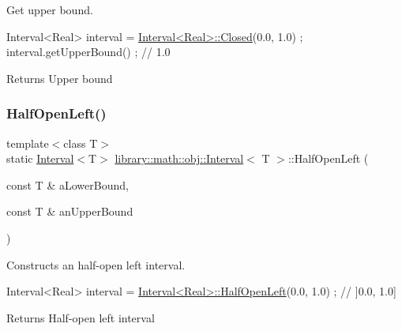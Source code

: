Get upper bound. 


\begin{DoxyCode}
Interval<Real> interval = \hyperlink{classlibrary_1_1math_1_1obj_1_1_interval_aae8bb2b89af450729338d48563def4d7}{Interval<Real>::Closed}(0.0, 1.0) ;
interval.getUpperBound() ; \textcolor{comment}{// 1.0}
\end{DoxyCode}


\begin{DoxyReturn}{Returns}
Upper bound 
\end{DoxyReturn}
\mbox{\label{classlibrary_1_1math_1_1obj_1_1_interval_a7e706c1e5133c731645e7633a9d763bd}} 
\subsubsection{\texorpdfstring{Half\+Open\+Left()}{HalfOpenLeft()}}
{\footnotesize\ttfamily template$<$class T$>$ \\
static \hyperlink{classlibrary_1_1math_1_1obj_1_1_interval}{Interval}$<$T$>$ \hyperlink{classlibrary_1_1math_1_1obj_1_1_interval}{library\+::math\+::obj\+::\+Interval}$<$ T $>$\+::Half\+Open\+Left (\begin{DoxyParamCaption}\item[{const T \&}]{a\+Lower\+Bound,  }\item[{const T \&}]{an\+Upper\+Bound }\end{DoxyParamCaption})\hspace{0.3cm}{\ttfamily [static]}}



Constructs an half-\/open left interval. 


\begin{DoxyCode}
Interval<Real> interval = \hyperlink{classlibrary_1_1math_1_1obj_1_1_interval_a7e706c1e5133c731645e7633a9d763bd}{Interval<Real>::HalfOpenLeft}(0.0, 1.0) ; \textcolor{comment}{// ]0.0,
       1.0]}
\end{DoxyCode}


\begin{DoxyReturn}{Returns}
Half-\/open left interval 
\end{DoxyReturn}
\mbox{\label{classlibrary_1_1math_1_1obj_1_1_interval_a1a15d0518cc69fa3e442fc39c0622477}} 

